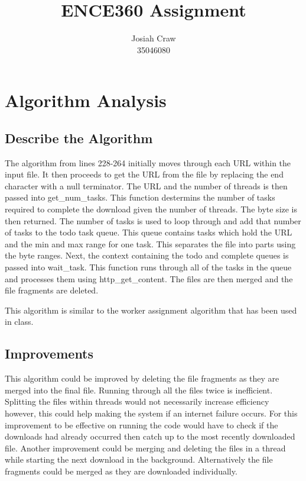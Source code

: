 \documentclass[12pt]{article}
\author{Josiah Craw\\35046080}
\title{\huge{ENCE360 Assignment}}
\begin{document}
\maketitle

\newpage

\section{Algorithm Analysis}
\subsection{Describe the Algorithm}
The algorithm from lines 228-264 initially moves through each URL within the input file. It then
proceeds to get the URL from the file by replacing the end character with a null terminator. The
URL and the number of threads is then passed into get\_num\_tasks. This function destermins the
number of tasks required to complete the download given the number of threads. The byte size is
then returned. The number of tasks is used to loop through and add that number of tasks to the
todo task queue. This queue contains tasks which hold the URL and the min and max range for one
task. This separates the file into parts using the byte ranges. Next, the context containing the
todo and complete queues is passed into wait\_task. This function runs through all of the tasks in
the queue and processes them using http\_get\_content. The files are then merged and the file
fragments are deleted.

This algorithm is similar to the worker assignment algorithm that has been used in class.

\subsection{Improvements}
This algorithm could be improved by deleting the file fragments as they are merged into the final
file. Running through all the files twice is inefficient. Splitting the files within threads would
not necessarily increase efficiency however, this could help making the system if an internet
failure occurs. For this improvement to be effective on running the code would have to check if
the downloads had already occurred then catch up to the most recently downloaded file. Another
improvement could be merging and deleting the files in a thread while starting the next download
in the background. Alternatively the file fragments could be merged as they are downloaded
individually. 
\end{document}
